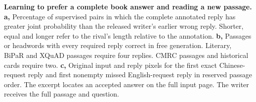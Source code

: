 \textbf{Learning to prefer a complete book answer and reading a new passage.}
\textbf{a,} Percentage of supervised pairs in which the complete annotated reply has greater joint probability than the released writer's earlier wrong reply. Shorter, equal and longer refer to the rival's length relative to the annotation. \textbf{b,} Passages or headwords with every required reply correct in free generation. Literary, BiPaR and XQuAD passages require four replies. CMRC passages and historical cards require two. \textbf{c,} Original input and reply pixels for the first exact Chinese-request reply and first nonempty missed English-request reply in reserved passage order. The excerpt locates an accepted answer on the full input page. The writer receives the full passage and question.
